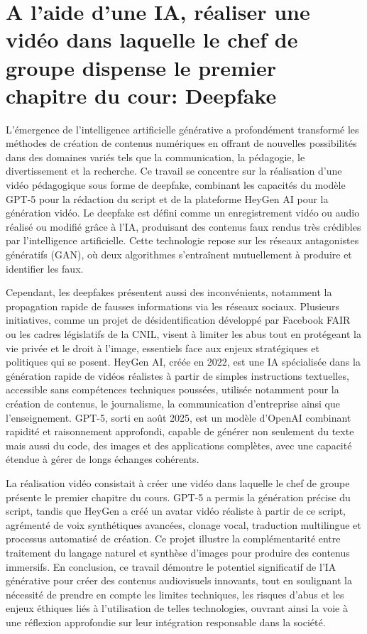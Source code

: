 \documentclass[11pt,a4paper]{article}
\begin{document}
	
	\section{ A l'aide d'une IA, réaliser une vidéo dans laquelle le chef de groupe dispense le premier chapitre du cour: Deepfake }
	\vspace{0.5cm}
	L’émergence de l’intelligence artificielle générative a profondément transformé les méthodes de création de contenus numériques en offrant de nouvelles possibilités dans des domaines variés tels que la communication, la pédagogie, le divertissement et la recherche. Ce travail se concentre sur la réalisation d’une vidéo pédagogique sous forme de deepfake, combinant les capacités du modèle GPT-5 pour la rédaction du script et de la plateforme HeyGen AI pour la génération vidéo. Le deepfake est défini comme un enregistrement vidéo ou audio réalisé ou modifié grâce à l’IA, produisant des contenus faux rendus très crédibles par l’intelligence artificielle. Cette technologie repose sur les réseaux antagonistes génératifs (GAN), où deux algorithmes s’entraînent mutuellement à produire et identifier les faux.
	
	Cependant, les deepfakes présentent aussi des inconvénients, notamment la propagation rapide de fausses informations via les réseaux sociaux. Plusieurs initiatives, comme un projet de désidentification développé par Facebook FAIR ou les cadres législatifs de la CNIL, visent à limiter les abus tout en protégeant la vie privée et le droit à l’image, essentiels face aux enjeux stratégiques et politiques qui se posent. HeyGen AI, créée en 2022, est une IA spécialisée dans la génération rapide de vidéos réalistes à partir de simples instructions textuelles, accessible sans compétences techniques poussées, utilisée notamment pour la création de contenus, le journalisme, la communication d’entreprise ainsi que l’enseignement. GPT-5, sorti en août 2025, est un modèle d’OpenAI combinant rapidité et raisonnement approfondi, capable de générer non seulement du texte mais aussi du code, des images et des applications complètes, avec une capacité étendue à gérer de longs échanges cohérents.
	
	La réalisation vidéo consistait à créer une vidéo dans laquelle le chef de groupe présente le premier chapitre du cours. GPT-5 a permis la génération précise du script, tandis que HeyGen a créé un avatar vidéo réaliste à partir de ce script, agrémenté de voix synthétiques avancées, clonage vocal, traduction multilingue et processus automatisé de création. Ce projet illustre la complémentarité entre traitement du langage naturel et synthèse d’images pour produire des contenus immersifs. En conclusion, ce travail démontre le potentiel significatif de l’IA générative pour créer des contenus audiovisuels innovants, tout en soulignant la nécessité de prendre en compte les limites techniques, les risques d’abus et les enjeux éthiques liés à l’utilisation de telles technologies, ouvrant ainsi la voie à une réflexion approfondie sur leur intégration responsable dans la société.
\end{document}
